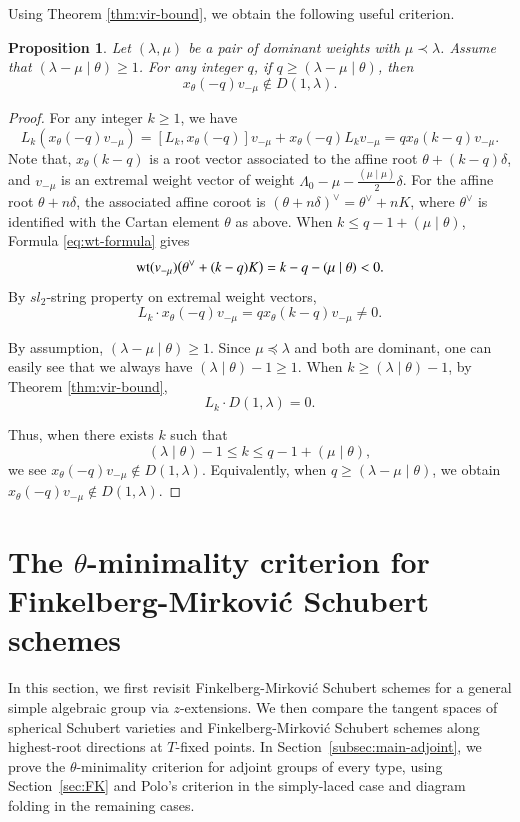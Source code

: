 \documentclass[a4paper, 12pt]{amsart}
\newtheorem{proposition}[theorem]{Proposition}
\theoremstyle{definition}
\begin{document}
Using Theorem \ref{thm:vir-bound}, we obtain the following useful criterion.
\begin{proposition} \label{prop:nonincl} Let $(\lambda,\mu)$ be a pair of dominant weights with $\mu\prec \lambda$. Assume that  $ (\lambda-\mu\mid \theta) \geq 1$. For any integer $q$, if $q\geq  (\lambda-\mu\mid \theta)$,  then
\[  x_\theta(-q)v_{-\mu} \notin  D(1,  \lambda)  .\]
\end{proposition}
\begin{proof}
For any integer $k\geq 1$, we have
\[ L_k(x_\theta(-q)v_{-\mu} )=[L_k, x_\theta(-q)]v_{-\mu}+ x_\theta(-q )L_kv_{-\mu} =q  x_\theta(k-q)v_{-\mu} . \]
Note that, $x_\theta(k-q)$ is a root vector associated to the affine root $\theta+ (k-q)\delta$, and $v_{-\mu}$ is an extremal weight vector of weight $\Lambda_0- \mu-\frac{ (\mu\mid \mu)}{2}\delta$.  
For the affine root $\theta+n\delta$, the associated affine coroot is
$(\theta+n\delta)^\vee=\theta^\vee+nK$, where $\theta^\vee$ is
identified with the Cartan element $\theta$ as above.
When $k \leq q-1+ (\mu\mid \theta)$, Formula \eqref{eq:wt-formula} gives
\[
{\rm wt}(v_{-\mu})\bigl(\theta^\vee+(k-q)K\bigr)
=k-q-(\mu\mid \theta)<0.
\]
By $sl_2$-string property on extremal weight vectors,  
$$L_k\cdot x_\theta(-q)v_{-\mu} = qx_\theta(k-q)v_{-\mu}\not=0.$$  

By assumption, $ (\lambda-\mu\mid \theta) \geq 1$. Since $\mu \preceq \lambda$ and both are dominant, one can easily see that we always have $(\lambda\mid \theta)-1 \geq 1$. 
When $k \geq (\lambda\mid \theta)-1$,  by Theorem \ref{thm:vir-bound}, 
  $$L_k\cdot D(1,\lambda)  =0.$$
 
    Thus, when there exists $k$ such that
    $$ (\lambda\mid \theta)-1\leq k \leq  q-1+ (\mu\mid \theta) ,$$
    we see $x_{\theta}(-q)v_{-\mu} \notin D(1,\lambda)$.  Equivalently, when $q\geq (\lambda-\mu\mid \theta)$,   we obtain  $x_\theta(-q)v_{-\mu} \not\in D(1,\lambda)$.
\end{proof}




\section{The $\theta$-minimality criterion for Finkelberg-Mirkovi\'c Schubert schemes}\label{sect:main_thm}

In this section, we first revisit Finkelberg-Mirkovi\'c Schubert schemes
for a general simple algebraic group via $z$-extensions. We then compare
the tangent spaces of spherical Schubert varieties and
Finkelberg-Mirkovi\'c Schubert schemes along highest-root directions at
$T$-fixed points. In Section~\ref{subsec:main-adjoint}, we prove
the $\theta$-minimality criterion for adjoint groups of every type,
using Section~\ref{sec:FK} and Polo's criterion in the simply-laced
case and diagram folding in the remaining cases.
\end{document}
